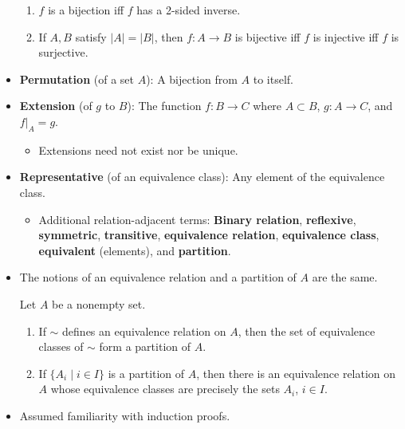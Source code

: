 \documentclass[../notes.tex]{subfiles}
\begin{document}
\begin{itemize}
\begin{proposition}
\begin{enumerate}
            \item $f$ is a bijection iff $f$ has a 2-sided inverse.
            \item If $A,B$ satisfy $|A|=|B|$, then $f:A\to B$ is bijective iff $f$ is injective iff $f$ is surjective.
        \end{enumerate}
    \end{proposition}
    \item \textbf{Permutation} (of a set $A$): A bijection from $A$ to itself.
    \item \textbf{Extension} (of $g$ to $B$): The function $f:B\to C$ where $A\subset B$, $g:A\to C$, and $f|_A=g$.
    \begin{itemize}
        \item Extensions need not exist nor be unique.
    \end{itemize}
    \item \textbf{Representative} (of an equivalence class): Any element of the equivalence class.
    \begin{itemize}
        \item Additional relation-adjacent terms: \textbf{Binary relation}, \textbf{reflexive}, \textbf{symmetric}, \textbf{transitive}, \textbf{equivalence relation}, \textbf{equivalence class}, \textbf{equivalent} (elements), and \textbf{partition}.
    \end{itemize}
    \item The notions of an equivalence relation and a partition of $A$ are the same.
    \begin{proposition}\label{prp:0.2}
        Let $A$ be a nonempty set.
        \begin{enumerate}
            \item If $\sim$ defines an equivalence relation on $A$, then the set of equivalence classes of $\sim$ form a partition of $A$.
            \item If $\{A_i\mid i\in I\}$ is a partition of $A$, then there is an equivalence relation on $A$ whose equivalence classes are precisely the sets $A_i$, $i\in I$.
        \end{enumerate}
    \end{proposition}
    \item Assumed familiarity with induction proofs.
\end{itemize}
\end{document}
